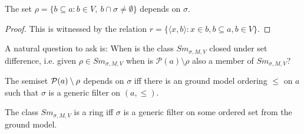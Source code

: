 \begin{proposition}
The set $\rho=\{b\subseteq a:b\in V,\ b\cap \sigma\neq\emptyset\}$ depends on $\sigma$.
\end{proposition}
\begin{proof}
This is witnessed by the relation $r=\{\langle x,b\rangle: x\in b, b\subseteq a, b\in V\}$.
\end{proof}

A natural question to ask is: When is the class $Sm_{\sigma,M,V}$ closed under set difference, i.e.
given $\rho\in Sm_{\sigma,M,V}$ when is $\mathcal{P}(a)\setminus\rho$ also a member of $Sm_{\sigma,M,V}$?

\begin{proposition} The semiset ${{\mathcal P}}(a)\setminus\rho$ depends on $\sigma$ iff there is an ground model
 ordering $\leq$ on $a$ such that $\sigma$ is a generic filter on $(a,\leq)$.
\end{proposition}

\begin{corollary} The class $Sm_{\sigma,M,V}$ is a ring iff $\sigma$ is a generic filter on some ordered
 set from the ground model.
\end{corollary}

